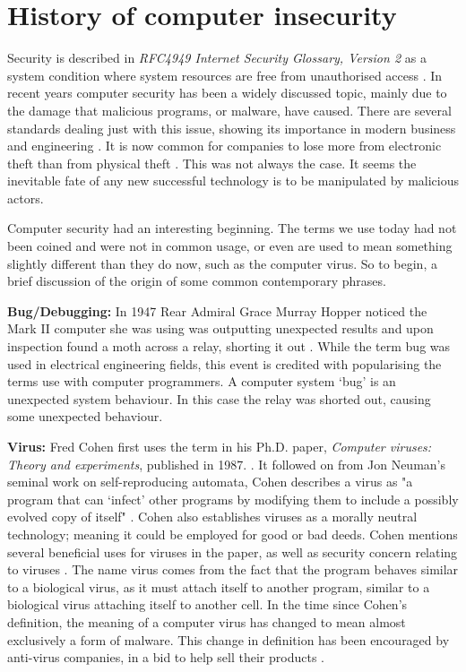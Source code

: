 \section{History of computer insecurity}
\label{History of computer insecurity}
Security is described in \textit{RFC4949 Internet Security Glossary, Version 2} as a system condition where system resources are free from unauthorised access 
\cite{RN66}. In recent years computer security has been a widely discussed topic, mainly due to the damage that malicious programs, or malware, have caused. There are several standards dealing just with this issue, showing its importance in modern business and engineering 
\cite{RN70}\cite{RN68}\cite{RN69}. It is now common for companies to lose more from electronic theft than from physical theft 
\cite{RN76}. This was not always the case. It seems the inevitable fate of any new successful technology is to be manipulated by malicious actors. 

Computer security had an interesting beginning. The terms we use today had not been coined and were not in common usage, or even are used to mean something slightly different than they do now, such as the computer virus. So to begin, a brief discussion of the origin of some common contemporary phrases.

\textbf{Bug/Debugging:} In 1947 Rear Admiral Grace Murray Hopper noticed the Mark II computer she was using was outputting unexpected results and upon inspection found a moth across a relay, shorting it out 
\cite{RN75}. While the term bug was used in electrical engineering fields, this event is credited with popularising the terms use with computer programmers. A computer system ‘bug’ is an unexpected system behaviour. In this case the relay was shorted out, causing some unexpected behaviour. 

\textbf{Virus:} Fred Cohen first uses the term in his Ph.D. paper, \textit{Computer viruses: Theory and experiments}, published in 1987. 
\cite{RN61}. It followed on from Jon Neuman’s seminal work on self-reproducing automata, Cohen describes a virus as "a program that can ‘infect’ other programs by modifying them to include a possibly evolved copy of itself" \cite{RN61}. Cohen also establishes viruses as a morally neutral technology; meaning it could be employed for good or bad deeds. Cohen mentions several beneficial uses for viruses in the paper, as well as security concern relating to viruses \cite{RN61}. The name virus comes from the fact that the program behaves similar to a biological virus, as it must attach itself to another program, similar to a biological virus attaching itself to another cell. In the time since Cohen's definition, the meaning of a computer virus has changed to mean almost exclusively a form of malware. This change in definition has been encouraged by anti-virus companies, in a bid to help sell their products 
\cite{RN64}. 

